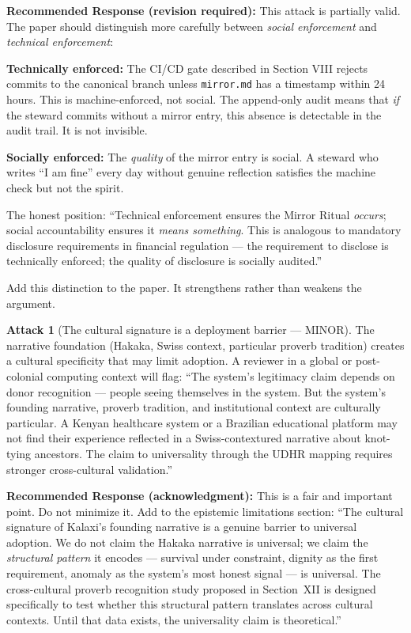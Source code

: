 \documentclass[12pt,a4paper]{article}
\theoremstyle{definition}
\newtheorem{attack}{Attack}[section]
\begin{document}
\begin{mdframed}[style=defenseframe]
\textbf{Recommended Response (revision required):}
This attack is partially valid. The paper should distinguish more carefully between
\emph{social enforcement} and \emph{technical enforcement}:

\textbf{Technically enforced:} The CI/CD gate described in Section VIII rejects
commits to the canonical branch unless \texttt{mirror.md} has a timestamp within
24 hours. This is machine-enforced, not social. The append-only audit means that
\emph{if} the steward commits without a mirror entry, this absence is detectable
in the audit trail. It is not invisible.

\textbf{Socially enforced:} The \emph{quality} of the mirror entry is social.
A steward who writes ``I am fine'' every day without genuine reflection satisfies
the machine check but not the spirit.

The honest position: ``Technical enforcement ensures the Mirror Ritual \emph{occurs};
social accountability ensures it \emph{means something}. This is analogous to
mandatory disclosure requirements in financial regulation — the requirement to
disclose is technically enforced; the quality of disclosure is socially audited.''

Add this distinction to the paper. It strengthens rather than weakens the argument.
\end{mdframed}

\begin{attack}[The cultural signature is a deployment barrier — MINOR]
\label{att:cultural}
The narrative foundation (Hakaka, Swiss context, particular proverb tradition)
creates a cultural specificity that may limit adoption. A reviewer in a global
or post-colonial computing context will flag: ``The system's legitimacy claim
depends on donor recognition — people seeing themselves in the system. But the
system's founding narrative, proverb tradition, and institutional context are
culturally particular. A Kenyan healthcare system or a Brazilian educational
platform may not find their experience reflected in a Swiss-contextured narrative
about knot-tying ancestors. The claim to universality through the UDHR mapping
requires stronger cross-cultural validation.''
\end{attack}

\begin{mdframed}[style=defenseframe]
\textbf{Recommended Response (acknowledgment):}
This is a fair and important point. Do not minimize it. Add to the epistemic
limitations section: ``The cultural signature of Kalaxi's founding narrative
is a genuine barrier to universal adoption. We do not claim the Hakaka narrative
is universal; we claim the \emph{structural pattern} it encodes — survival under
constraint, dignity as the first requirement, anomaly as the system's most honest
signal — is universal. The cross-cultural proverb recognition study proposed in
Section~XII is designed specifically to test whether this structural pattern
translates across cultural contexts. Until that data exists, the universality
claim is theoretical.''
\end{mdframed}
\end{document}
